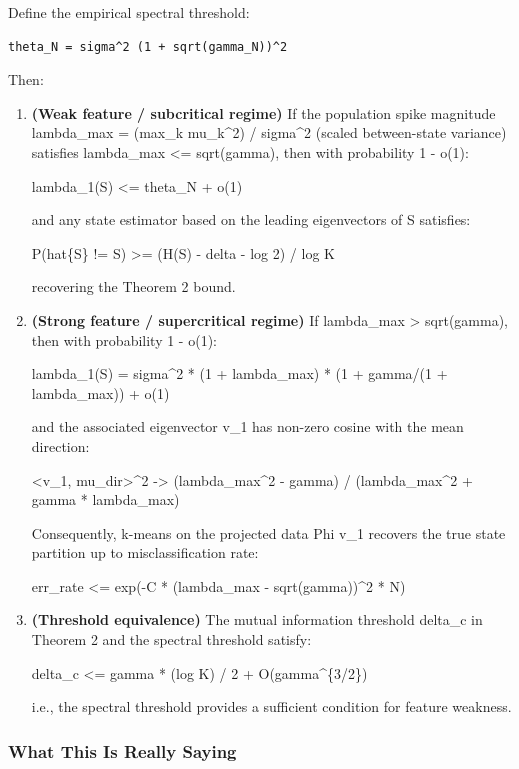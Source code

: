 \documentclass[
  12pt,
]{article}
\begin{document}
Define the empirical spectral threshold:

\begin{verbatim}
theta_N = sigma^2 (1 + sqrt(gamma_N))^2
\end{verbatim}

Then:

\begin{enumerate}
\def\labelenumi{\arabic{enumi}.}
\item
  \textbf{(Weak feature / subcritical regime)} If the population spike
  magnitude lambda\_max = (max\_k
  \textbar\textbar mu\_k\textbar\textbar\^{}2) / sigma\^{}2 (scaled
  between-state variance) satisfies lambda\_max \textless= sqrt(gamma),
  then with probability 1 - o(1):

  lambda\_1(S) \textless= theta\_N + o(1)

  and any state estimator based on the leading eigenvectors of S
  satisfies:

  P(hat\{S\} != S) \textgreater= (H(S) - delta - log 2) / log K

  recovering the Theorem 2 bound.
\item
  \textbf{(Strong feature / supercritical regime)} If lambda\_max
  \textgreater{} sqrt(gamma), then with probability 1 - o(1):

  lambda\_1(S) = sigma\^{}2 * (1 + lambda\_max) * (1 + gamma/(1 +
  lambda\_max)) + o(1)

  and the associated eigenvector v\_1 has non-zero cosine with the mean
  direction:

  \textbar\textless v\_1, mu\_dir\textgreater\textbar\^{}2
  -\textgreater{} (lambda\_max\^{}2 - gamma) / (lambda\_max\^{}2 + gamma
  * lambda\_max)

  Consequently, k-means on the projected data Phi v\_1 recovers the true
  state partition up to misclassification rate:

  err\_rate \textless= exp(-C * (lambda\_max - sqrt(gamma))\^{}2 * N)
\item
  \textbf{(Threshold equivalence)} The mutual information threshold
  delta\_c in Theorem 2 and the spectral threshold satisfy:

  delta\_c \textless= gamma * (log K) / 2 + O(gamma\^{}\{3/2\})

  i.e., the spectral threshold provides a sufficient condition for
  feature weakness.
\end{enumerate}

\subsubsection{What This Is Really
Saying}\label{what-this-is-really-saying}
\end{document}
